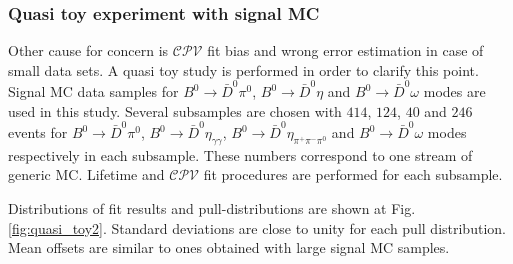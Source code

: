 \documentclass[preprint,aps,showpacs]{revtex4}
\newcommand{\cpvconj}{\ensuremath{\mathcal{CPV}}\xspace}
\newcommand{\bdpi}{\ensuremath{B^0\to \bar D^0\pi^0}\xspace}
\newcommand{\bdeta}{\ensuremath{B^0\to \bar D^0\eta}\xspace}
\newcommand{\bdetagg}{\ensuremath{B^0\to \bar D^0\eta_{\gamma\gamma}}\xspace}
\newcommand{\bdetappp}{\ensuremath{B^0\to \bar D^0\eta_{\pi^+\pi^-\pi^0}}\xspace}
\newcommand{\bdomega}{\ensuremath{B^0\to \bar D^0\omega}\xspace}
\begin{document}
\subsubsection{Quasi toy experiment with signal MC}\label{sec:mc_cpv_toy}
Other cause for concern is \cpvconj fit bias and wrong error estimation in case of small data sets. A quasi toy study is performed in order to clarify this point.
Signal MC data samples for \bdpi, \bdeta and \bdomega modes are used in this study. Several subsamples are chosen with $414$, $124$, $40$ and $246$ events for \bdpi, \bdetagg, \bdetappp and \bdomega modes respectively in each subsample. These numbers correspond to one stream of generic MC. 
Lifetime and \cpvconj fit procedures are performed for each subsample.

Distributions of fit results and pull-distributions are shown at Fig.\,\ref{fig:quasi_toy2}. Standard deviations are close to unity for each pull distribution. Mean offsets are similar to ones obtained with large signal MC samples.

\end{document}
